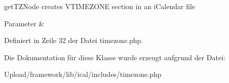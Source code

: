 get\+T\+Z\+Node creates V\+T\+I\+M\+E\+Z\+O\+NE section in an i\+Calendar file


\begin{DoxyParams}{Parameter}
{\em } & \\
\hline
\end{DoxyParams}


Definiert in Zeile 32 der Datei timezone.\+php.



Die Dokumentation für diese Klasse wurde erzeugt aufgrund der Datei\+:\begin{DoxyCompactItemize}
\item 
Upload/framework/lib/ical/includes/timezone.\+php\end{DoxyCompactItemize}
